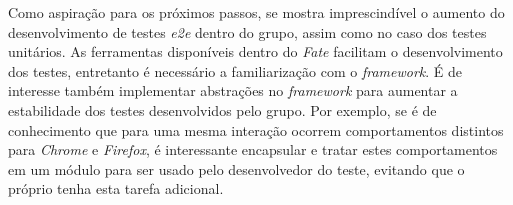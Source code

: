 Como aspiração para os próximos passos, se mostra imprescindível o aumento do desenvolvimento de testes \emph{e2e} dentro do grupo, assim como no caso dos testes unitários. As ferramentas disponíveis dentro do \emph{Fate} facilitam o desenvolvimento dos testes, entretanto é necessário a familiarização com o \emph{framework}. É de interesse também implementar abstrações no \emph{framework} para aumentar a estabilidade dos testes desenvolvidos pelo grupo. Por exemplo, se é de conhecimento que para uma mesma interação ocorrem comportamentos distintos para \emph{Chrome} e \emph{Firefox}, é interessante encapsular e tratar estes comportamentos em um módulo para ser usado pelo desenvolvedor do teste, evitando que o próprio tenha esta tarefa adicional.
